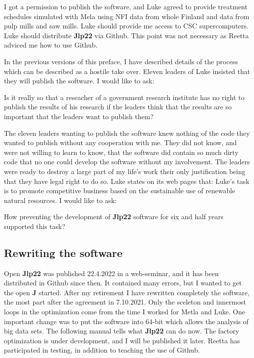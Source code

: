 I got a 
permission to publish the software, and Luke agreed to 
provide  treatment schedules simulated with Mela using NFI data from whole Finland and data 
from pulp mills and saw mills. 
Luke should provide me access to CSC supercomputers.  Luke should distribute \textbf{Jlp22} via Github.  This point 
was not necessary as Reetta adviced me how to use Github. 
 
 
In the previous versions of this preface, I have described details of the process which can be 
described as a hostile take over. Eleven leaders of Luke insisted that they will publish the software. 
I would like to ask: 
 
Is it really so that a reseacher of a government research institute has no right to 
publish the results of his 
research if the leaders think that the results are so important that the leaders want to publish them? 
 
The eleven leaders wanting to publish the software knew nothing of the 
code they wanted to publish without any cooperation with me. They did not know, 
and were not willing to learn to know, that the software did contain so much dirty 
code that no one could develop the software without my involvement. The leaders were ready 
to destroy a large part of my life's work their only justification being that they have legal right to 
do so. Luke states on its web pages that: 
Luke’s task is to promote competitive business based on the sustainable use of 
renewable natural resources. I would like to ask: 
 
How preventing the development of \textbf{Jlp22} software for six and half years supported this task? 
 
 
\subsection*{Rewriting the software} 
 
Open \textbf{Jlp22} was published 22.4.2022 in a web-seminar, and it has been distributed in Github since then. 
It contained many errors, but I wanted to get the open \textbf{J} started. 
After my retirement I have rewritten completely the software, 
the most part after the agreement in 7.10.2021. 
Only the sceleton and innermost loops in the optimization come from the time I worked 
for Metla and Luke. One important change was to put the software into 64-bit which 
allows the analysis of big data sets. The following manual tells what \textbf{Jlp22} can do now. 
The factory optimization is under development, and I will be published it later. 
Reetta has participated 
in testing, in addition to teaching the use of Github. 
 
